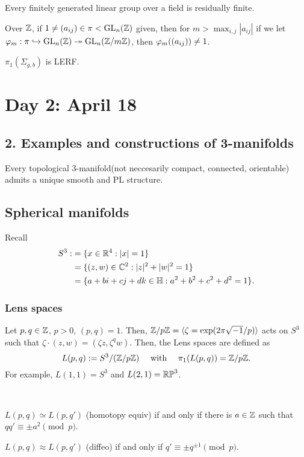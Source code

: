 \documentclass{../../../small}
\begin{document}
\begin{thm}
Every finitely generated linear group over a field is residually finite.
\end{thm}

Over $\mathbb{Z}$, if $1\ne(a_{ij})\in\pi<\mathrm{GL}_n(\mathbb{Z})$ given, then for $m>\max_{i,j}|a_{ij}|$ if we let $\varphi_m:\pi\hookrightarrow\mathrm{GL}_n(\mathbb{Z})\twoheadrightarrow\mathrm{GL}_n(\mathbb{Z}/m\mathbb{Z})$, then $\varphi_m((a_{ij}))\ne1$.

\begin{thm}[Scott]
$\pi_1(\Sigma_{g,b})$ is LERF.
\end{thm}


\section{Day 2: April 18}

\subsection*{2. Examples and constructions of 3-manifolds}

\begin{thm}[Moise]
Every topological 3-manifold(not neccesarily compact, connected, orientable) admits a unique smooth and PL structure.
\end{thm}

\subsection{Spherical manifolds}

Recall
\begin{align*}
S^3:&=\{x\in\mathbb{R}^4:|x|=1\}\\
&=\{(z,w)\in\mathbb{C}^2:|z|^2+|w|^2=1\}\\
&=\{a+bi+cj+dk\in\mathbb{H}:a^2+b^2+c^2+d^2=1\}.
\end{align*}
\subsubsection*{Lens spaces}
Let $p,q\in\mathbb{Z}$, $p>0$, $(p,q)=1$.
Then, $\mathbb{Z}/p\mathbb{Z}=\langle\zeta=\exp(2\pi\sqrt{-1}/p)\rangle$ acts on $S^3$ such that $\zeta\cdot(z,w)=(\zeta z,\zeta^qw)$.
Then, the Lens spaces are defined as
\[L(p,q):=S^3/(\mathbb{Z}/p\mathbb{Z})\quad\text{ with }\quad\pi_1(L(p,q))=\mathbb{Z}/p\mathbb{Z}.\]
For example, $L(1,1)=S^3$ and $L(2,1)=\mathbb{RP}^3$.


\begin{thm}[Reidemeister]\,
\begin{parts}
\item $L(p,q)\simeq L(p,q')$ (homotopy equiv) if and only if there is $a\in\mathbb{Z}$ such that $qq'\equiv\pm a^2\pmod p$.
\item $L(p,q)\approx L(p,q')$ (diffeo) if and only if $q'\equiv\pm q^{\pm1}\pmod p$.
\end{parts}
\end{thm}
\end{document}
